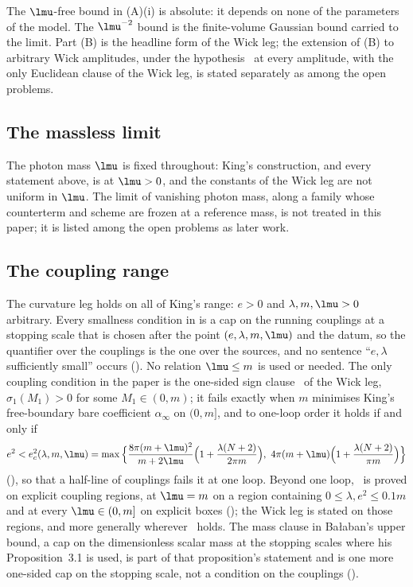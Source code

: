 The $\lmu$-free bound in (A)(i) is absolute: it depends on none of the parameters of the model. The
$\lmu^{-2}$ bound is the finite-volume Gaussian bound carried to the limit. Part (B) is the headline form
of the Wick leg; the extension of (B) to arbitrary Wick amplitudes, under the hypothesis \Wtwo\ at every
amplitude, with the only Euclidean clause of the Wick leg, is stated separately as 
among the open problems.

\subsection{The massless limit}

The photon mass $\lmu$ is fixed throughout: King's construction, and every statement above, is at
$\lmu>0$, and the constants of the Wick leg are not uniform in $\lmu$. The limit of vanishing photon mass,
along a family whose counterterm and scheme are frozen at a reference mass, is not treated in this paper;
it is listed among the open problems as later work.

\subsection{The coupling range}

The curvature leg holds on all of King's range: $e>0$ and $\lambda,m,\lmu>0$ arbitrary. Every smallness
condition in \cite{K1,K2,Ba1,Ba2,Ba3,Ba4} is a cap on the running couplings at a stopping scale that is
chosen after the point $(e,\lambda,m,\lmu)$ and the datum, so the quantifier over the couplings is the one
over the sources, and no sentence ``$e,\lambda$ sufficiently small'' occurs
(). No relation $\lmu\le m$ is used or needed. The only coupling
condition in the paper is the one-sided sign clause \Tthree\ of the Wick leg, $\sigma_1(M_1)>0$ for some
$M_1\in(0,m)$; it fails exactly when $m$ minimises King's free-boundary bare coefficient $\alpha_\infty$ on
$(0,m]$, and to one-loop order it holds if and only if
\[
e^2<e_c^2(\lambda,m,\lmu)=\max\Big\{\frac{8\pi(m+\lmu)^2}{m+2\lmu}\Big(1+\frac{\lambda(N+2)}{2\pi m}\Big),\
4\pi(m+\lmu)\Big(1+\frac{\lambda(N+2)}{\pi m}\Big)\Big\}
\]
(), so that a half-line of couplings fails it at one loop. Beyond one loop, \Tthree\ is
proved on explicit coupling regions, at $\lmu=m$ on a region containing $0\le\lambda,e^2\le0.1m$ and at
every $\lmu\in(0,m]$ on explicit boxes (\Cref{prop:s14:T3}); the Wick leg is stated on those regions, and
more generally wherever \Tthree\ holds. The mass clause in Ba{\l}aban's upper bound, a cap on the
dimensionless scalar mass at the stopping scales where his Proposition~3.1 is used, is part of that
proposition's statement and is one more one-sided cap on the stopping scale, not a condition on the
couplings (\Cref{rem:s14:BALm}).

